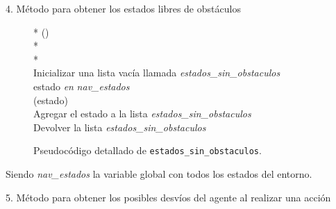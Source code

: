 \documentclass[conference,a4paper]{IEEEtran}
\begin{document}
4. Método para obtener los estados libres de obstáculos

\begin{figure}[h]
  \begin{pseudo}*
    () \\*
     \\*
    \\
    Inicializar una lista vacía llamada \textit{estados\_sin\_obstaculos} \\
     estado \textit{en} \textit{nav\_estados}  \\
    \>  (estado)  \\
    \> \> Agregar el estado a la lista \textit{estados\_sin\_obstaculos} \\
    Devolver la lista \textit{estados\_sin\_obstaculos}
  \end{pseudo}
  \caption{Pseudocódigo detallado de \texttt{estados\_sin\_obstaculos}.}
  \label{fig:estados_sin_obstaculos}
\end{figure}

Siendo \textit{nav\_estados} la variable global con todos los estados del entorno.\newline

5. Método para obtener los posibles desvíos del agente al realizar una acción
\end{document}
